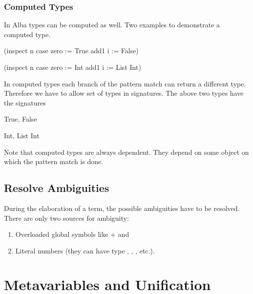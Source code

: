 \subsubsection{Computed Types}

In Alba types can be computed as well. Two examples to demonstrate a computed
type.
%
\begin{alba}
    (inspect n case
        zero := True
        add1 i := False)

    (inspect n case
        zero := Int
        add1 i := List Int)
\end{alba}
%
In computed types each branch of the pattern match can return a different type.
Therefore we have to allow set of types in signatures. The above two types have
the signatures
%
\begin{alba}
    {True, False}

    {Int, List Int}
\end{alba}

Note that computed types are always dependent. They depend on some object on
which the pattern match is done.





\subsection{Resolve Ambiguities}

During the elaboration of a term, the possible ambiguities have to be resolved.
There are only two sources for ambiguity:
%
\begin{enumerate}

\item Overloaded global symbols like $+$ and 

\item Literal numbers (they can have type , ,
, etc.).

\end{enumerate}




\section{Metavariables and Unification}
